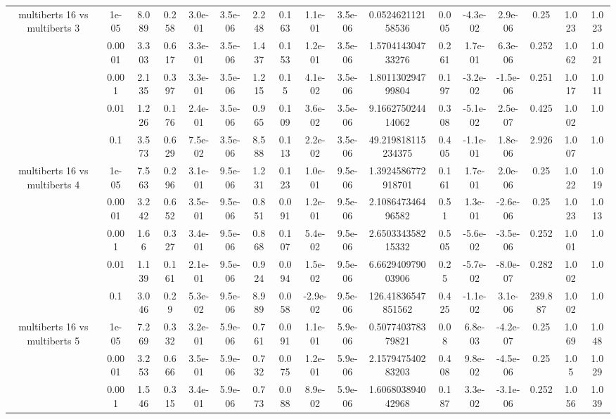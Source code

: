 \begin{tabular}{|c|c|c|c|c|c|c|c|c|c|c|c|c|c|c|c|c|}
\hline
\multirow{5}{*}{multiberts 16 vs multiberts 3} & 1e-05 & 8.089 & 0.258 & 3.0e-01 & 3.5e-06 & 2.248 & 0.163 & 1.1e-01 & 3.5e-06 & 0.052462112158536 & 0.005 & -4.3e-02 & 2.9e-06 & 0.25 & 1.023 & 1.023 \\
 & 0.0001 & 3.303 & 0.617 & 3.3e-01 & 3.5e-06 & 1.437 & 0.153 & 1.2e-01 & 3.5e-06 & 1.570414304733276 & 0.261 & 1.7e-01 & 6.3e-06 & 0.252 & 1.062 & 1.021 \\
 & 0.001 & 2.135 & 0.397 & 3.3e-01 & 3.5e-06 & 1.215 & 0.15 & 4.1e-02 & 3.5e-06 & 1.801130294799804 & 0.197 & -3.2e-02 & -1.5e-06 & 0.251 & 1.017 & 1.011 \\
 & 0.01 & 1.226 & 0.176 & 2.4e-01 & 3.5e-06 & 0.965 & 0.109 & 3.6e-02 & 3.5e-06 & 9.166275024414062 & 0.308 & -5.1e-02 & 2.5e-07 & 0.425 & 1.002 & 1.0 \\
 & 0.1 & 3.573 & 0.629 & 7.5e-02 & 3.5e-06 & 8.588 & 0.113 & 2.2e-02 & 3.5e-06 & 49.219818115234375 & 0.405 & -1.1e-01 & 1.8e-06 & 2.926 & 1.007 & 1.0 \\
\hline
\multirow{5}{*}{multiberts 16 vs multiberts 4} & 1e-05 & 7.563 & 0.296 & 3.1e-01 & 9.5e-06 & 1.231 & 0.123 & 1.0e-01 & 9.5e-06 & 1.3924586772918701 & 0.161 & 1.7e-01 & 2.0e-06 & 0.25 & 1.022 & 1.019 \\
 & 0.0001 & 3.242 & 0.652 & 3.5e-01 & 9.5e-06 & 0.851 & 0.091 & 1.2e-01 & 9.5e-06 & 2.108647346496582 & 0.51 & 1.3e-01 & -2.6e-06 & 0.25 & 1.023 & 1.013 \\
 & 0.001 & 1.66 & 0.327 & 3.4e-01 & 9.5e-06 & 0.868 & 0.107 & 5.4e-02 & 9.5e-06 & 2.650334358215332 & 0.505 & -5.6e-02 & -3.5e-06 & 0.252 & 1.001 & 1.0 \\
 & 0.01 & 1.139 & 0.161 & 2.1e-01 & 9.5e-06 & 0.924 & 0.094 & 1.5e-02 & 9.5e-06 & 6.662940979003906 & 0.25 & -5.7e-02 & -8.0e-07 & 0.282 & 1.002 & 1.0 \\
 & 0.1 & 3.046 & 0.29 & 5.3e-02 & 9.5e-06 & 8.989 & 0.058 & -2.9e-02 & 9.5e-06 & 126.41836547851562 & 0.425 & -1.1e-02 & 3.1e-06 & 239.887 & 1.002 & 1.0 \\
\hline
\multirow{5}{*}{multiberts 16 vs multiberts 5} & 1e-05 & 7.269 & 0.332 & 3.2e-01 & 5.9e-06 & 0.761 & 0.091 & 1.1e-01 & 5.9e-06 & 0.507740378379821 & 0.08 & 6.8e-03 & -4.2e-07 & 0.25 & 1.069 & 1.048 \\
 & 0.0001 & 3.253 & 0.666 & 3.5e-01 & 5.9e-06 & 0.732 & 0.075 & 1.2e-01 & 5.9e-06 & 2.157947540283203 & 0.408 & 9.8e-02 & -4.5e-06 & 0.25 & 1.05 & 1.029 \\
 & 0.001 & 1.546 & 0.315 & 3.4e-01 & 5.9e-06 & 0.773 & 0.088 & 8.9e-02 & 5.9e-06 & 1.606803894042968 & 0.187 & 3.3e-02 & -3.1e-06 & 0.252 & 1.056 & 1.039 \\

\end{tabular}
